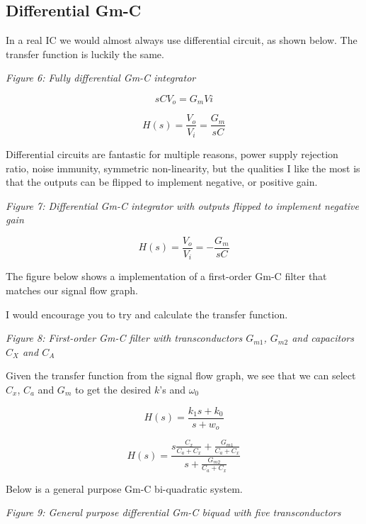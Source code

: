 \subsection{Differential Gm-C}\label{differential-gm-c}

In a real IC we would almost always use differential circuit, as shown
below. The transfer function is luckily the same.


{
\centering
{}
}

\emph{Figure 6: Fully differential Gm-C integrator}

\[ s C V_o = G_m Vi \]

\[ H(s) = \frac{V_o}{V_i} = \frac{G_m}{sC}\]

Differential circuits are fantastic for multiple reasons, power supply
rejection ratio, noise immunity, symmetric non-linearity, but the
qualities I like the most is that the outputs can be flipped to
implement negative, or positive gain.


{
\centering
{}
}

\emph{Figure 7: Differential Gm-C integrator with outputs flipped to
implement negative gain}

\[ H(s) = \frac{V_o}{V_i} = -\frac{G_m}{sC}\]

The figure below shows a implementation of a first-order Gm-C filter
that matches our signal flow graph.

I would encourage you to try and calculate the transfer function.


{
\centering
{}
}

\emph{Figure 8: First-order Gm-C filter with transconductors \(G_{m1}\),
\(G_{m2}\) and capacitors \(C_X\) and \(C_A\)}

Given the transfer function from the signal flow graph, we see that we
can select \(C_x\), \(C_a\) and \(G_m\) to get the desired \(k\)'s and
\(\omega_0\)

\[ H(s) = \frac{ k_1 s + k_0 }{s + w_o}\]

\[ H(s) = \frac{s \frac{C_x}{C_a + C_x} + \frac{G_{m1}}{C_a + C_x}}{s +
 \frac{G_{m2}}{C_a + C_x}}\]

Below is a general purpose Gm-C bi-quadratic system.


{
\centering
{}
}

\emph{Figure 9: General purpose differential Gm-C biquad with five
transconductors}

